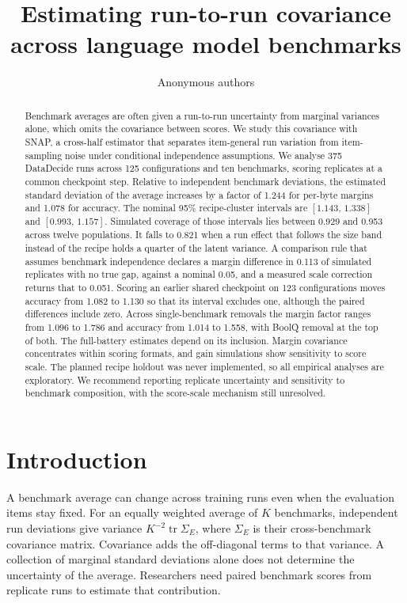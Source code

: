 \documentclass{article}
\title{Estimating run-to-run covariance\\across language model benchmarks}
\author{Anonymous authors}
\newcommand{\ci}[2]{\ensuremath{[#1,\,#2]}}
\newcommand{\Sig}{\Sigma_E}
\begin{document}
\maketitle
\begin{abstract}
Benchmark averages are often given a run-to-run uncertainty from marginal variances alone, which omits the covariance between scores. We study this covariance with SNAP, a cross-half estimator that separates item-general run variation from item-sampling noise under conditional independence assumptions. We analyse 375 DataDecide runs across 125 configurations and ten benchmarks, scoring replicates at a common checkpoint step. Relative to independent benchmark deviations, the estimated standard deviation of the average increases by a factor of 1.244 for per-byte margins and 1.078 for accuracy. The nominal 95\% recipe-cluster intervals are \ci{1.143}{1.338} and \ci{0.993}{1.157}. Simulated coverage of those intervals lies between 0.929 and 0.953 across twelve populations. It falls to 0.821 when a run effect that follows the size band instead of the recipe holds a quarter of the latent variance. A comparison rule that assumes benchmark independence declares a margin difference in 0.113 of simulated replicates with no true gap, against a nominal 0.05, and a measured scale correction returns that to 0.051. Scoring an earlier shared checkpoint on 123 configurations moves accuracy from 1.082 to 1.130 so that its interval excludes one, although the paired differences include zero. Across single-benchmark removals the margin factor ranges from 1.096 to 1.786 and accuracy from 1.014 to 1.558, with BoolQ removal at the top of both. The full-battery estimates depend on its inclusion. Margin covariance concentrates within scoring formats, and gain simulations show sensitivity to score scale. The planned recipe holdout was never implemented, so all empirical analyses are exploratory. We recommend reporting replicate uncertainty and sensitivity to benchmark composition, with the score-scale mechanism still unresolved.
\end{abstract}

\section{Introduction}
A benchmark average can change across training runs even when the evaluation items stay fixed. For an equally weighted average of $K$ benchmarks, independent run deviations give variance $K^{-2}\operatorname{tr}\Sig$, where $\Sig$ is their cross-benchmark covariance matrix. Covariance adds the off-diagonal terms to that variance. A collection of marginal standard deviations alone does not determine the uncertainty of the average. Researchers need paired benchmark scores from replicate runs to estimate that contribution.
\end{document}
